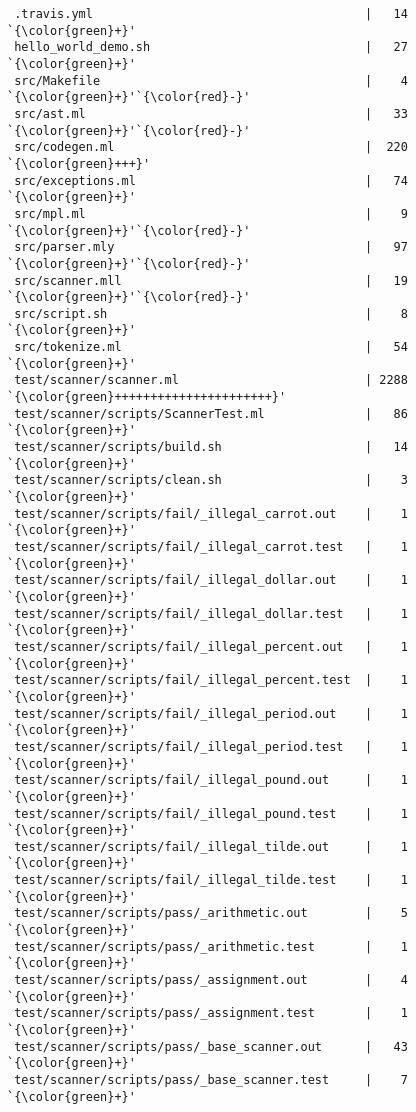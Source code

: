 \begin{lstlisting}
 .travis.yml                                      |   14 `{\color{green}+}'
 hello_world_demo.sh                              |   27 `{\color{green}+}'
 src/Makefile                                     |    4 `{\color{green}+}'`{\color{red}-}'
 src/ast.ml                                       |   33 `{\color{green}+}'`{\color{red}-}'
 src/codegen.ml                                   |  220 `{\color{green}+++}'
 src/exceptions.ml                                |   74 `{\color{green}+}'
 src/mpl.ml                                       |    9 `{\color{green}+}'`{\color{red}-}'
 src/parser.mly                                   |   97 `{\color{green}+}'`{\color{red}-}'
 src/scanner.mll                                  |   19 `{\color{green}+}'`{\color{red}-}'
 src/script.sh                                    |    8 `{\color{green}+}'
 src/tokenize.ml                                  |   54 `{\color{green}+}'
 test/scanner/scanner.ml                          | 2288 `{\color{green}++++++++++++++++++++++}'
 test/scanner/scripts/ScannerTest.ml              |   86 `{\color{green}+}'
 test/scanner/scripts/build.sh                    |   14 `{\color{green}+}'
 test/scanner/scripts/clean.sh                    |    3 `{\color{green}+}'
 test/scanner/scripts/fail/_illegal_carrot.out    |    1 `{\color{green}+}'
 test/scanner/scripts/fail/_illegal_carrot.test   |    1 `{\color{green}+}'
 test/scanner/scripts/fail/_illegal_dollar.out    |    1 `{\color{green}+}'
 test/scanner/scripts/fail/_illegal_dollar.test   |    1 `{\color{green}+}'
 test/scanner/scripts/fail/_illegal_percent.out   |    1 `{\color{green}+}'
 test/scanner/scripts/fail/_illegal_percent.test  |    1 `{\color{green}+}'
 test/scanner/scripts/fail/_illegal_period.out    |    1 `{\color{green}+}'
 test/scanner/scripts/fail/_illegal_period.test   |    1 `{\color{green}+}'
 test/scanner/scripts/fail/_illegal_pound.out     |    1 `{\color{green}+}'
 test/scanner/scripts/fail/_illegal_pound.test    |    1 `{\color{green}+}'
 test/scanner/scripts/fail/_illegal_tilde.out     |    1 `{\color{green}+}'
 test/scanner/scripts/fail/_illegal_tilde.test    |    1 `{\color{green}+}'
 test/scanner/scripts/pass/_arithmetic.out        |    5 `{\color{green}+}'
 test/scanner/scripts/pass/_arithmetic.test       |    1 `{\color{green}+}'
 test/scanner/scripts/pass/_assignment.out        |    4 `{\color{green}+}'
 test/scanner/scripts/pass/_assignment.test       |    1 `{\color{green}+}'
 test/scanner/scripts/pass/_base_scanner.out      |   43 `{\color{green}+}'
 test/scanner/scripts/pass/_base_scanner.test     |    7 `{\color{green}+}'

\end{lstlisting}
